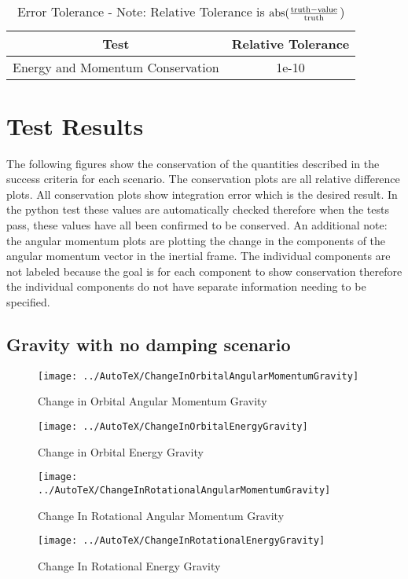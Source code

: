 \begin{table}[htbp]
	\caption{Error Tolerance - Note: Relative Tolerance is $\textnormal{abs}(\frac{\textnormal{truth} - \textnormal{value}}{\textnormal{truth}}$)}
	\label{tab:errortol}
	\centering \fontsize{10}{10}\selectfont
	\begin{tabular}{| c | c |} %
		\hline
		Test   & Relative Tolerance \\
		\hline
		Energy and Momentum Conservation & 1e-10 \\
		\hline	
	\end{tabular}
\end{table}

\clearpage

\section{Test Results}

The following figures show the conservation of the quantities described in the success criteria for each scenario. The conservation plots are all relative difference plots. All conservation plots show integration error which is the desired result. In the python test these values are automatically checked therefore when the tests pass, these values have all been confirmed to be conserved. An additional note: the angular momentum plots are plotting the change in the components of the angular momentum vector in the inertial frame. The individual components are not labeled because the goal is for each component to show conservation therefore the individual components do not have separate information needing to be specified.  

\subsection{Gravity with no damping scenario}
\begin{figure}[htbp]
	\centerline{
		\texttt{[image: ../AutoTeX/ChangeInOrbitalAngularMomentumGravity]}}
	\caption{Change in Orbital Angular Momentum Gravity}
	\label{fig:ChangeInOrbitalAngularMomentumGravity}
\end{figure}
\begin{figure}[htbp]
	\centerline{
		\texttt{[image: ../AutoTeX/ChangeInOrbitalEnergyGravity]}}
	\caption{Change in Orbital Energy Gravity}
	\label{fig:ChangeInOrbitalEnergyGravity}
\end{figure}
\begin{figure}[htbp]
	\centerline{
		\texttt{[image: ../AutoTeX/ChangeInRotationalAngularMomentumGravity]}}
	\caption{Change In Rotational Angular Momentum Gravity}
	\label{fig:ChangeInRotationalAngularMomentumGravity}
\end{figure}
\begin{figure}[htbp]
	\centerline{
		\texttt{[image: ../AutoTeX/ChangeInRotationalEnergyGravity]}}
	\caption{Change In Rotational Energy Gravity}
	\label{fig:ChangeInRotationalEnergyGravity}
\end{figure}
\clearpage

